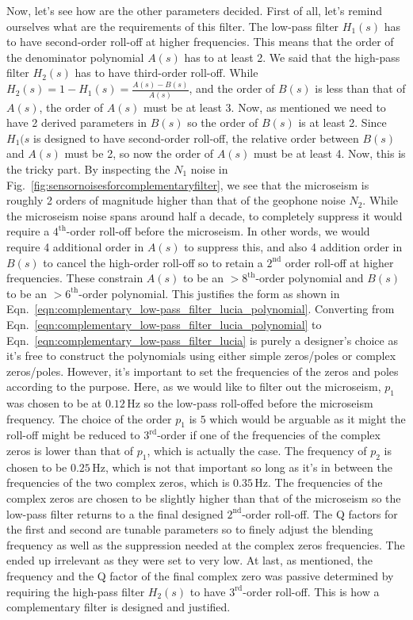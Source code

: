 Now, let's see how are the other parameters decided.
First of all, let's remind ourselves what are the requirements of this filter.
The low-pass filter $H_1(s)$ has to have second-order roll-off at higher frequencies.
This means that the order of the denominator polynomial $A(s)$ has to at least 2.
We said that the high-pass filter $H_2(s)$ has to have third-order roll-off.
While $H_2(s) = 1-H_1(s) = \frac{A(s)-B(s)}{A(s)}$, and the order of $B(s)$ is less than that of $A(s)$, the order of $A(s)$ must be at least 3.
Now, as mentioned we need to have 2 derived parameters in $B(s)$ so the order of $B(s)$ is at least 2.
Since $H_1(s$ is designed to have second-order roll-off, the relative order between $B(s)$ and $A(s)$ must be 2, so now the order of $A(s)$ must be at least 4.
Now, this is the tricky part.
By inspecting the $N_1$ noise in Fig.~\ref{fig:sensornoisesforcomplementaryfilter}, we see that the microseism is roughly 2 orders of magnitude higher than that of the geophone noise $N_2$.
While the microseism noise spans around half a decade, to completely suppress it would require a $4^\mathrm{th}$-order roll-off before the microseism.
In other words, we would require 4 additional order in $A(s)$ to suppress this, and also 4 addition order in $B(s)$ to cancel the high-order roll-off so to retain a $2^\mathrm{nd}$ order roll-off at higher frequencies.
These constrain $A(s)$ to be an $>8^\mathrm{th}$-order polynomial and $B(s)$ to be an $>6^\mathrm{th}$-order polynomial.
This justifies the form as shown in Eqn.~\eqref{eqn:complementary_low-pass_filter_lucia_polynomial}.
Converting from Eqn.~\eqref{eqn:complementary_low-pass_filter_lucia_polynomial} to Eqn.~\eqref{eqn:complementary_low-pass_filter_lucia} is purely a designer's choice as it's free to construct the polynomials using either simple zeros/poles or complex zeros/poles.
However, it's important to set the frequencies of the zeros and poles according to the purpose.
Here, as we would like to filter out the microseism, $p_1$ was chosen to be at $0.12\,\mathrm{Hz}$ so the low-pass roll-offed before the microseism frequency.
The choice of the order $p_1$ is $5$ which would be arguable as it might the roll-off might be reduced to $3^\mathrm{rd}$-order if one of the frequencies of the complex zeros is lower than that of $p_1$, which is actually the case.
The frequency of $p_2$ is chosen to be $0.25\,\mathrm{Hz}$, which is not that important so long as it's
in between the frequencies of the two complex zeros, which is $0.35\,\mathrm{Hz}$.
The frequencies of the complex zeros are chosen to be slightly higher than that of the microseism so the low-pass filter returns to a the final designed $2^\mathrm{nd}$-order roll-off.
The Q factors for the first and second are tunable parameters so to finely adjust the blending frequency as well as the suppression needed at the complex zeros frequencies.
The ended up irrelevant as they were set to very low.
At last, as mentioned, the frequency and the Q factor of the final complex zero was passive determined by requiring the high-pass filter $H_2(s)$ to have $3^\mathrm{rd}$-order roll-off.
This is how a complementary filter is designed and justified.


